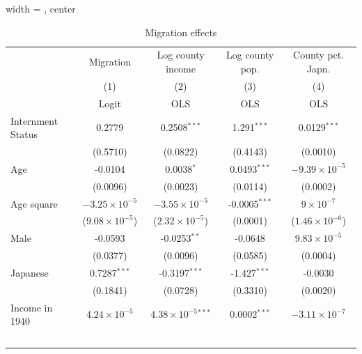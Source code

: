 \begin{table}[htbp]
   \caption{\label{tbl:reg3} Migration effects}
   \begin{adjustbox}{width = \textwidth, center}
      \begin{tabular}{lcccc}
         \toprule
                             & Migration               & Log county income             & Log county pop.         & County pct. Japn.\\  
                             & (1)                     & (2)                           & (3)                     & (4)\\  
                             &  Logit                  & OLS                           & OLS                     & OLS\\  
         \midrule 
         Internment Status   & 0.2779                  & 0.2508$^{***}$                & 1.291$^{***}$           & 0.0129$^{***}$\\   
                             & (0.5710)                & (0.0822)                      & (0.4143)                & (0.0010)\\   
         Age                 & -0.0104                 & 0.0038$^{*}$                  & 0.0493$^{***}$          & $-9.39\times 10^{-5}$\\    
                             & (0.0096)                & (0.0023)                      & (0.0114)                & (0.0002)\\   
         Age square          & $-3.25\times 10^{-5}$   & $-3.55\times 10^{-5}$         & -0.0005$^{***}$         & $9\times 10^{-7}$\\    
                             & ($9.08\times 10^{-5}$)  & ($2.32\times 10^{-5}$)        & (0.0001)                & ($1.46\times 10^{-6}$)\\    
         Male                & -0.0593                 & -0.0253$^{**}$                & -0.0648                 & $9.83\times 10^{-5}$\\    
                             & (0.0377)                & (0.0096)                      & (0.0585)                & (0.0004)\\   
         Japanese            & 0.7287$^{***}$          & -0.3197$^{***}$               & -1.427$^{***}$          & -0.0030\\   
                             & (0.1841)                & (0.0728)                      & (0.3310)                & (0.0020)\\   
         Income in 1940      & $4.24\times 10^{-5}$    & $4.38\times 10^{-5}$$^{***}$  & 0.0002$^{***}$          & $-3.11\times 10^{-7}$\\    
$$
\end{tabular}
\end{adjustbox}
\end{table}
